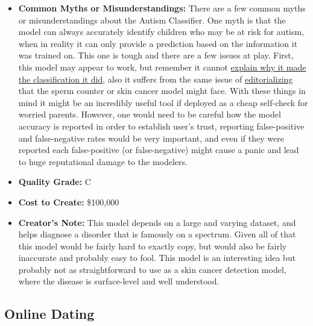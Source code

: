 \begin{itemize}
    \item \textbf{Common Myths or Misunderstandings:}  There are a few common myths or misunderstandings about the Autism Classifier. One myth is that the model can always accurately identify children who may be at risk for autism, when in reality it can only provide a prediction based on the information it was trained on. This one is tough and there are a few issues at play. First, this model may appear to work, but remember it cannot \hyperref[sec:explain]{explain why it made the classification it did}, also it suffers from the same issue of \hyperref[sec:janitor]{editorializing} that the sperm counter or skin cancer model might face. With these things in mind it might be an incredibly useful tool if deployed as a cheap self-check for worried parents. However, one would need to be careful how the model accuracy is reported in order to establish user's trust, reporting false-positive and false-negative rates would be very important, and even if they were reported each false-positive (or false-negative) might cause a panic and lead to huge reputational damage to the modelers.   
    \item \textbf{Quality Grade:} C
    \item \textbf{Cost to Create:} \$100,000
    \item \textbf{Creator's Note:} This model depends on a large and varying dataset, and helps diagnose a disorder that is famously on a spectrum. Given all of that this model would be fairly hard to exactly copy, but would also be fairly inaccurate and probably easy to fool. This model is an interesting idea but probably not as straightforward to use as a skin cancer detection model, where the disease is surface-level and well understood.
\end{itemize}

\subsection{Online Dating}

